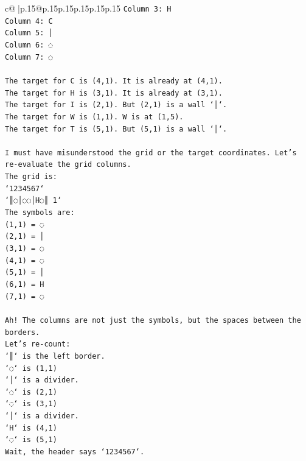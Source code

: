 \documentclass{article}
\begin{document}
{\begin{supertabular}{c@{$\;$}|p{.15\linewidth}@{}p{.15\linewidth}p{.15\linewidth}p{.15\linewidth}p{.15\linewidth}p{.15\linewidth}}
{{{\texttt{Column 3: H} \\
\texttt{Column 4: C} \\
\texttt{Column 5: │} \\
\texttt{Column 6: ◌} \\
\texttt{Column 7: ◌} \\
\\ 
\texttt{The target for C is (4,1). It is already at (4,1).} \\
\texttt{The target for H is (3,1). It is already at (3,1).} \\
\texttt{The target for I is (2,1). But (2,1) is a wall `│`.} \\
\texttt{The target for W is (1,1). W is at (1,5).} \\
\texttt{The target for T is (5,1). But (5,1) is a wall `│`.} \\
\\ 
\texttt{I must have misunderstood the grid or the target coordinates. Let's re{-}evaluate the grid columns.} \\
\texttt{The grid is:} \\
\texttt{`1234567`} \\
\texttt{`║◌│◌◌│H◌║ 1`} \\
\texttt{The symbols are:} \\
\texttt{(1,1) = ◌} \\
\texttt{(2,1) = │} \\
\texttt{(3,1) = ◌} \\
\texttt{(4,1) = ◌} \\
\texttt{(5,1) = │} \\
\texttt{(6,1) = H} \\
\texttt{(7,1) = ◌} \\
\\ 
\texttt{Ah! The columns are not just the symbols, but the spaces between the borders.} \\
\texttt{Let's re{-}count:} \\
\texttt{`║` is the left border.} \\
\texttt{`◌` is (1,1)} \\
\texttt{`│` is a divider.} \\
\texttt{`◌` is (2,1)} \\
\texttt{`◌` is (3,1)} \\
\texttt{`│` is a divider.} \\
\texttt{`H` is (4,1)} \\
\texttt{`◌` is (5,1)} \\
\texttt{Wait, the header says `1234567`.} \\
}}}
\end{supertabular}}
\end{document}
